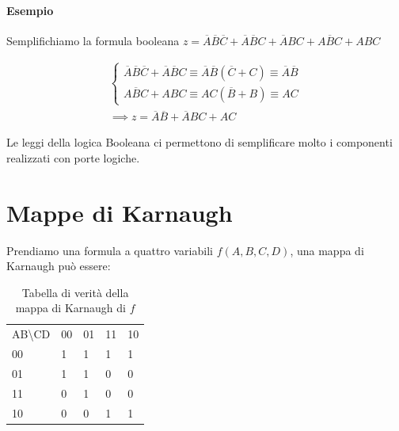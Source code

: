 \paragraph{Esempio}
Semplifichiamo la formula booleana $ z = \overbar{A}\overbar{B}\overbar{C} + \overbar{A}\overbar{B}C + \overbar{A}BC + A\overbar{B}C + ABC $

\begin{align}
\begin{cases}
\overbar{A}\overbar{B}\overbar{C} + \overbar{A}\overbar{B}C \equiv \overbar{A}\overbar{B}(\overbar{C}+C) \equiv \overbar{A}\overbar{B} \\ 
A\overbar{B}C + ABC \equiv AC(\overbar{B}+B) \equiv AC
\end{cases} \\
\implies z = \overbar{A}\overbar{B} + \overbar{A}BC + AC
\end{align}

Le leggi della logica Booleana ci permettono di semplificare molto i componenti realizzati con porte logiche.

\section{Mappe di Karnaugh}


Prendiamo una formula a quattro variabili $ f(A,B,C,D) $, una mappa di Karnaugh può essere:
\begin{table}[H]
	\centering
	\caption{Tabella di verità della mappa di Karnaugh di $f$}
	\label{tab:karnaugh}
	\begin{tabular}{lllll}
		AB\textbackslash{}CD    & 00                     & 01                     & 11                     & 10                     \\ \cline{2-5} 
		\multicolumn{1}{l|}{00} & \multicolumn{1}{l|}{1} & \multicolumn{1}{l|}{1} & \multicolumn{1}{l|}{1} & \multicolumn{1}{l|}{1} \\ \cline{2-5} 
		\multicolumn{1}{l|}{01} & \multicolumn{1}{l|}{1} & \multicolumn{1}{l|}{1} & \multicolumn{1}{l|}{0} & \multicolumn{1}{l|}{0} \\ \cline{2-5} 
		\multicolumn{1}{l|}{11} & \multicolumn{1}{l|}{0} & \multicolumn{1}{l|}{1} & \multicolumn{1}{l|}{0} & \multicolumn{1}{l|}{0} \\ \cline{2-5} 
		\multicolumn{1}{l|}{10} & \multicolumn{1}{l|}{0} & \multicolumn{1}{l|}{0} & \multicolumn{1}{l|}{1} & \multicolumn{1}{l|}{1} \\ \cline{2-5} 
	\end{tabular}
\end{table}

